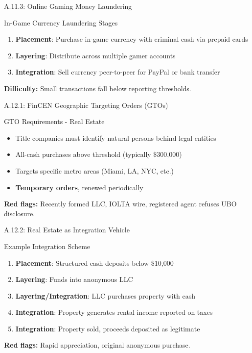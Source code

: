 \documentclass{beamer}
\begin{document}
	\begin{frame}{A.11.3: Online Gaming Money Laundering}
		\begin{block}{In-Game Currency Laundering Stages}
			\begin{enumerate}
				\item \textbf{Placement}: Purchase in-game currency with criminal cash via prepaid cards
				\item \textbf{Layering}: Distribute across multiple gamer accounts
				\item \textbf{Integration}: Sell currency peer-to-peer for PayPal or bank transfer
			\end{enumerate}
		\end{block}
		\textbf{Difficulty:} Small transactions fall below reporting thresholds.
	\end{frame}
	
	
	\begin{frame}{A.12.1: FinCEN Geographic Targeting Orders (GTOs)}
		\begin{block}{GTO Requirements - Real Estate}
			\begin{itemize}
				\item Title companies must identify natural persons behind legal entities
				\item All-cash purchases above threshold (typically \$300,000)
				\item Targets specific metro areas (Miami, LA, NYC, etc.)
				\item \textbf{Temporary orders}, renewed periodically
			\end{itemize}
		\end{block}
		\textbf{Red flags:} Recently formed LLC, IOLTA wire, registered agent refuses UBO disclosure.
	\end{frame}
	
	\begin{frame}{A.12.2: Real Estate as Integration Vehicle}
		\begin{block}{Example Integration Scheme}
			\begin{enumerate}
				\item \textbf{Placement}: Structured cash deposits below \$10,000
				\item \textbf{Layering}: Funds into anonymous LLC
				\item \textbf{Layering/Integration}: LLC purchases property with cash
				\item \textbf{Integration}: Property generates rental income reported on taxes
				\item \textbf{Integration}: Property sold, proceeds deposited as legitimate
			\end{enumerate}
		\end{block}
		\textbf{Red flags:} Rapid appreciation, original anonymous purchase.
	\end{frame}
	
\end{document}
